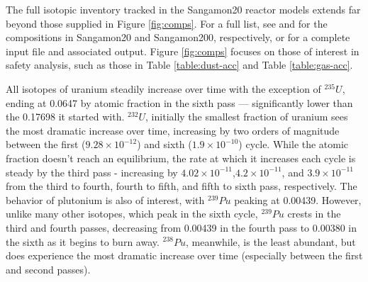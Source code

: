 

The full isotopic inventory tracked in the Sangamon20 reactor models extends far beyond those supplied in Figure \ref{fig:comps}.  For a full list, see \cite{richter_isotopic_2021} and \cite{richter_isotopic_2022} for the compositions in Sangamon20 and Sangamon200, respectively, or \cite{richter_zoerichterphlox_2022} for a complete input file and associated output.  Figure \ref{fig:comps} focuses on those of interest in safety analysis, such as those in Table \ref{table:dust-acc} and Table \ref{table:gas-acc}.

All isotopes of uranium steadily increase over time with the exception of $^{235}U$, ending at 0.0647 by atomic fraction in the sixth pass --- significantly lower than the 0.17698 it started with.  $^{232}U$, initially the smallest fraction of uranium sees the most dramatic increase over time, increasing by two orders of magnitude between the first ($9.28\times10^{-12}$) and sixth ($1.9\times10^{-10}$) cycle.  While the atomic fraction doesn't reach an equilibrium, the rate at which it increases each cycle is steady by the third pass - increasing by $4.02\times10^{-11}$,$4.2\times10^{-11}$, and $3.9\times10^{-11}$ from the third to fourth, fourth to fifth, and fifth to sixth pass, respectively.  The behavior of plutonium is also of interest, with $^{239}Pu$ peaking at 0.00439.  However, unlike many other isotopes, which peak in the sixth cycle, $^{239}Pu$ crests in the third and fourth passes, decreasing from 0.00439 in the fourth pass to 0.00380 in the sixth as it begins to burn away.  $^{238}Pu$, meanwhile, is the least abundant, but does experience the most dramatic increase over time (especially between the first and second passes).



